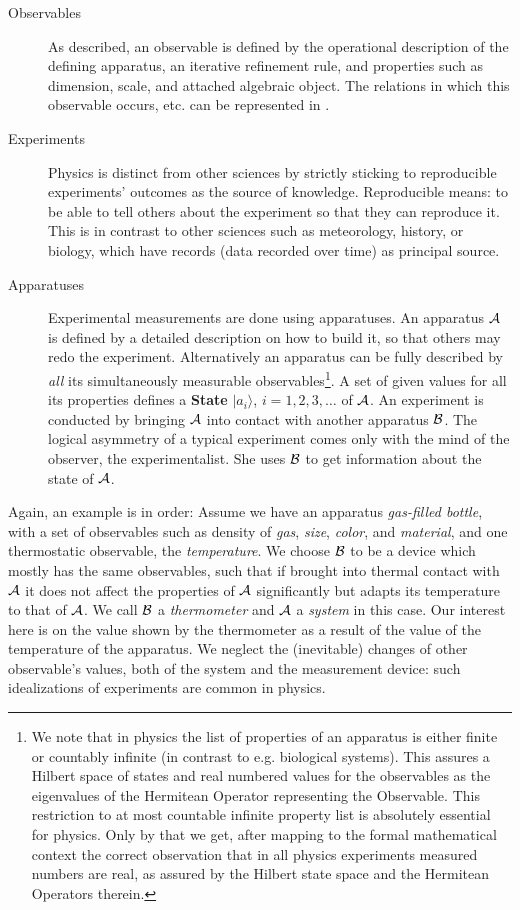 \begin{description}
\item[Observables] As described, an observable is defined by the operational description
  of the defining apparatus, an iterative refinement rule, and properties such as
  dimension, scale, and attached algebraic object. The relations in which this observable
  occurs, etc. can be represented in {\omdoc}.
\item[Experiments] Physics is distinct from other sciences by strictly sticking to
  reproducible experiments' outcomes as the source of knowledge. Reproducible means: to be
  able to tell others about the experiment so that they can reproduce it. This is in
  contrast to other sciences such as meteorology, history, or biology, which have records
  (data recorded over time) as principal source.
\item[Apparatuses] Experimental measurements are done using apparatuses.  An apparatus
  $\cal{A}$ is defined by a detailed description on how to build it, so that others may
  redo the experiment.  Alternatively an apparatus can be fully described by {\emph{all}}
  its simultaneously measurable observables\footnote{We note that in physics the list of
    properties of an apparatus is either finite or countably infinite (in contrast to e.g.
    biological systems).  This assures a Hilbert space of states and real numbered values
    for the observables as the eigenvalues of the Hermitean Operator representing the
    Observable.  This restriction to at most countable infinite property list is
    absolutely essential for physics.  Only by that we get, after mapping to the formal
    mathematical context the correct observation that in all physics experiments measured
    numbers are real, as assured by the Hilbert state space and the Hermitean Operators
    therein. }.  A set of given values for all its properties defines a {\textbf{State}}
  $|a_i\rangle$, $i=1,2,3,\ldots$ of $\cal{A}$.  An experiment is conducted by bringing
  $\cal{A}$ into contact with another apparatus $\cal{B}$. The logical asymmetry of a
  typical experiment comes only with the mind of the observer, the experimentalist. She
  uses $\cal{B}$ to get information about the state of $\cal{A}$.
\end{description}

Again, an example is in order: Assume we have an apparatus {\emph{gas-filled bottle}},
with a set of observables such as density of {\emph{gas}}, {\emph{size}}, {\emph{color}},
and {\emph{material}}, and one thermostatic observable, the {\emph{temperature}}.  We
choose $\cal{B}$ to be a device which mostly has the same observables, such that if
brought into thermal contact with $\cal{A}$ it does not affect the properties of $\cal{A}$
significantly but adapts its temperature to that of $\cal{A}$.  We call $\cal{B}$ a
{\emph{thermometer}} and $\cal{A}$ a {\emph{system}} in this case.  Our interest here is
on the value shown by the thermometer as a result of the value of the temperature of the
apparatus.  We neglect the (inevitable) changes of other observable's values, both of the
system and the measurement device: such idealizations of experiments are common in
physics.

